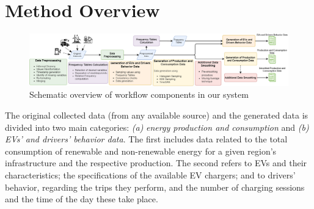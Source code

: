 \documentclass[sigconf]{acmart}
\begin{document}
\section{Method Overview}
\label{sec:methodOver}

\begin{figure}[h]
  \centering
  \includegraphics[width=0.81\linewidth]{Figures/ImplementationDiagram-ALL-paper.png}
  \caption{Schematic overview of workflow components in our system}
  \label{fig:dataflow}
\end{figure}

The original collected data (from any available source) and the generated data is divided into two main categories: 
    {\em (a)} {\em energy production and consumption} and
    {\em (b)} {\em EVs' and drivers' behavior data}.
The first includes data related to the total consumption of renewable and non-renewable energy for a given region's infrastructure and the respective production. The second %
refers to EVs and their characteristics; %
the specifications of the available EV chargers; %
and to drivers' behavior, regarding the trips they perform, and the number of charging sessions and the time of the day these take place. %
\end{document}
